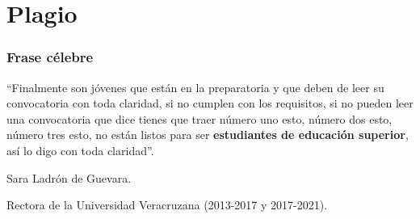 \documentclass[aspectratio=169]{beamer}
\begin{document}
\section{Plagio}




\begin{frame}
\frametitle{Frase célebre}
``Finalmente son jóvenes que están en la preparatoria y que deben de leer su convocatoria con toda claridad, si no cumplen con los requisitos, si no pueden leer una convocatoria que dice tienes que traer número uno esto, número dos esto, número tres esto, no están listos para ser \textbf{estudiantes de educación superior}, así lo digo con toda claridad''.

Sara Ladrón de Guevara.

Rectora de la Universidad Veracruzana (2013-2017 y 2017-2021).

\end{frame}





\end{document}
